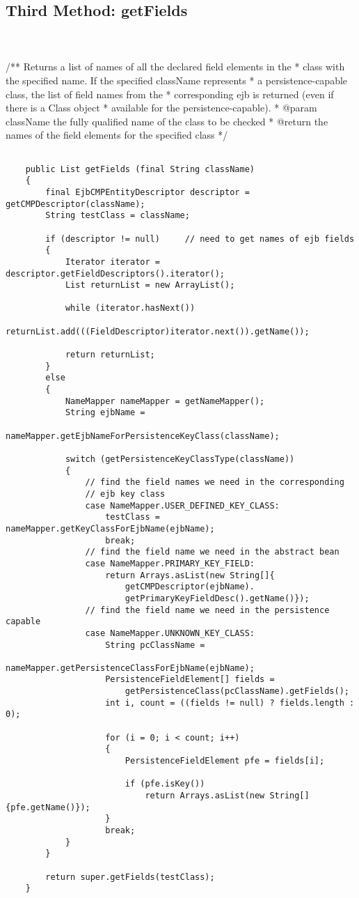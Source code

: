 \newpage
\subsection{Third Method: getFields} \\ \\

/** Returns a list of names of all the declared field elements in the 
	 * class with the specified name.  If the specified className represents 
	 * a persistence-capable class, the list of field names from the  
	 * corresponding ejb is returned (even if there is a Class object 
	 * available for the persistence-capable).
	 * @param className the fully qualified name of the class to be checked 
	 * @return the names of the field elements for the specified class
	 */
\begin{lstlisting}
	
	public List getFields (final String className)
	{
		final EjbCMPEntityDescriptor descriptor = getCMPDescriptor(className);
		String testClass = className;

		if (descriptor != null)		// need to get names of ejb fields
		{
			Iterator iterator = descriptor.getFieldDescriptors().iterator();
			List returnList = new ArrayList();

			while (iterator.hasNext())
				returnList.add(((FieldDescriptor)iterator.next()).getName());

			return returnList;
		}
		else
		{
			NameMapper nameMapper = getNameMapper();
			String ejbName = 
				nameMapper.getEjbNameForPersistenceKeyClass(className);

			switch (getPersistenceKeyClassType(className))
			{
				// find the field names we need in the corresponding 
				// ejb key class
				case NameMapper.USER_DEFINED_KEY_CLASS:
					testClass = nameMapper.getKeyClassForEjbName(ejbName);
					break;
				// find the field name we need in the abstract bean 
				case NameMapper.PRIMARY_KEY_FIELD:
					return Arrays.asList(new String[]{
						getCMPDescriptor(ejbName).
						getPrimaryKeyFieldDesc().getName()});
				// find the field name we need in the persistence capable 
				case NameMapper.UNKNOWN_KEY_CLASS:
					String pcClassName = 
						nameMapper.getPersistenceClassForEjbName(ejbName);
					PersistenceFieldElement[] fields = 
						getPersistenceClass(pcClassName).getFields();
					int i, count = ((fields != null) ? fields.length : 0);

					for (i = 0; i < count; i++)
					{
						PersistenceFieldElement pfe = fields[i];

						if (pfe.isKey())
							return Arrays.asList(new String[]{pfe.getName()});
					}
					break;
			}
		}

		return super.getFields(testClass);
	}
\end{lstlisting}


